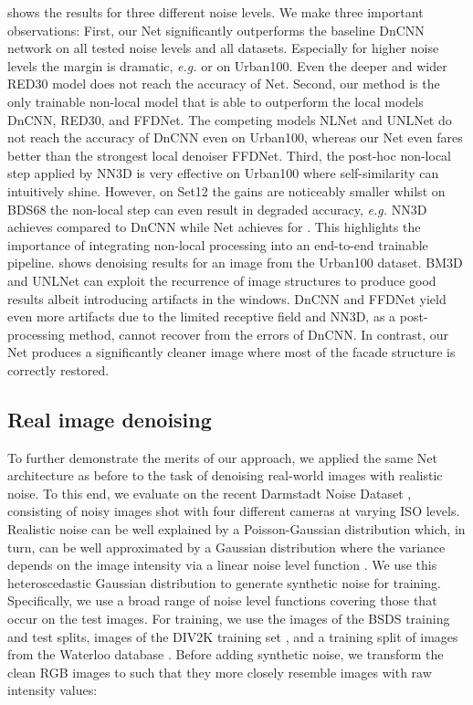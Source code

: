 \documentclass{article}
\makeatletter
\newcommand{\eg}{\emph{e.\thinspace{}g.}\@\xspace}
\makeatother
\begin{document}
 shows the results for three different noise levels. 
We make three important observations:
First, our Net significantly outperforms the baseline DnCNN network on all tested noise levels and all datasets. 
Especially for higher noise levels the margin is dramatic, \eg  or  on Urban100.
Even the deeper and wider RED30 model does not reach the accuracy of Net. 
Second, our method is the only trainable non-local model that is able to outperform the local models DnCNN, RED30, and FFDNet.
The competing models NLNet and UNLNet do not reach the accuracy of DnCNN even on Urban100, whereas our Net even fares better than the strongest local denoiser FFDNet.
Third, the post-hoc non-local step applied by NN3D is very effective on Urban100 where self-similarity can intuitively shine. 
However, on Set12 the gains are noticeably smaller whilst on BDS68 the non-local step can even result in degraded accuracy, \eg NN3D
achieves  compared to DnCNN while Net achieves   for .
This highlights the importance of integrating non-local processing into an end-to-end trainable pipeline.
 shows denoising results for an image from the Urban100 dataset. 
BM3D and UNLNet can exploit the recurrence of image structures to produce good results albeit introducing artifacts in the windows.
DnCNN and FFDNet yield even more artifacts due to the limited receptive field and NN3D, as a post-processing method, cannot recover from the errors of DnCNN.
In contrast, our Net produces a significantly cleaner image where most of the facade structure is correctly restored.

\subsection{Real image denoising}
To further demonstrate the merits of our approach, we applied the same Net architecture as before to the task of denoising real-world images with realistic noise.
To this end, we evaluate on the recent Darmstadt Noise Dataset \cite{Ploetz:2017:BDA}, consisting of  noisy images shot with four different cameras at varying ISO levels. 
Realistic noise can be well explained by a Poisson-Gaussian distribution which, in turn, can be well approximated by a Gaussian distribution where the variance depends on the image intensity via a linear noise level function \cite{Foi:2008:PPG}. 
We use this heteroscedastic Gaussian distribution to generate synthetic noise for training.
Specifically, we use a broad range of noise level functions covering those that occur on the test images. 
For training, we use the  images of the BSDS training and test splits,  images of the DIV2K training set \cite{Agustsson:2017:NTI}, and a training split of  images from the Waterloo database \cite{Ma:2017:WED}.
Before adding synthetic noise, we transform the clean RGB images  to  such that they more closely resemble images with raw intensity values:
\end{document}
